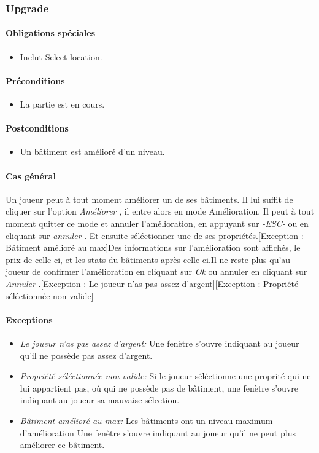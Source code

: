 \documentclass[a4paper,11pt]{report}
\begin{document}
\subsubsection{Upgrade}
\paragraph{Obligations spéciales}
\begin{itemize}
 \item Inclut Select location.
\end{itemize}
\paragraph{Préconditions}
\begin{itemize}
 \item La partie est en cours.
\end{itemize}
\paragraph{Postconditions}
\begin{itemize}
 \item Un bâtiment est amélioré d'un niveau.
\end{itemize}
\paragraph{Cas général}
Un joueur peut à tout moment améliorer un de ses bâtiments. Il lui suffit de cliquer sur l'option \og \textit{Améliorer} \fg, il entre alors en mode Amélioration. Il peut à tout moment quitter ce mode et annuler l'amélioration, en appuyant sur \og \textit{-ESC-} \fg ou en cliquant sur \og \textit{annuler} \fg. Et ensuite séléctionner une de ses propriétés.[Exception : Bâtiment amélioré au max]Des informations sur l'amélioration sont affichés, le prix de celle-ci, et les stats du bâtiments après celle-ci.Il ne reste plus qu'au joueur de confirmer l'amélioration en cliquant sur \og \textit{Ok} \fg ou annuler en cliquant sur \og \textit{Annuler} \fg.[Exception : Le joueur n'as pas assez d'argent][Exception : Propriété séléctionnée non-valide]
\paragraph{Exceptions}
\begin{itemize}
 \item \textit{Le joueur n'as pas assez d'argent:}  Une fenètre s'ouvre indiquant au joueur qu'il ne possède pas assez d'argent.
 \item \textit{Propriété séléctionnée non-valide:}  Si le joueur séléctionne une proprité qui ne lui appartient pas, où qui ne possède pas de bâtiment, une fenètre s'ouvre indiquant au joueur sa mauvaise sélection.
 \item \textit{Bâtiment amélioré au max:}  Les bâtiments ont un niveau maximum d'amélioration Une fenètre s'ouvre indiquant au joueur qu'il ne peut plus améliorer ce bâtiment.
\end{itemize}
\end{document}
